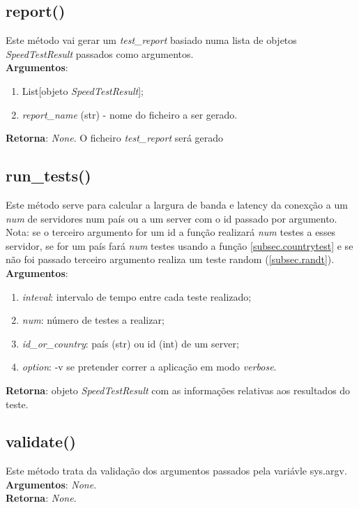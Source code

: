 \documentclass{report}
\begin{document}
\subsection{report()}
\label{subsec.report}
Este método vai gerar um \textit{test\_report} basiado numa lista de objetos \textit{SpeedTestResult} passados como argumentos.\\ 
\textbf{Argumentos}:
\begin{enumerate}
\item List[objeto \textit{SpeedTestResult}];
\item \textit{report\_name} (str) - nome do ficheiro a ser gerado.
\end{enumerate}
\textbf{Retorna}: \textit{None}. O ficheiro \textit{test\_report} será gerado

\subsection{run\_tests()}
\label{subsec.runt}
Este método serve para calcular a largura de banda e latency da conexção a um \textit{num} de servidores num país ou a um server com o id passado por argumento.\\
Nota: se o terceiro argumento for um id a função realizará \textit{num} testes a esses servidor, se for um país fará \textit{num} testes usando a função \autoref{subsec.countrytest} e se não foi passado terceiro argumento realiza um teste random (\autoref{subsec.randt}).\\
\textbf{Argumentos}: 
\begin{enumerate}
\item \textit{inteval}: intervalo de tempo entre cada teste realizado;
\item \textit{num}: número de testes a realizar;
\item \textit{id\_or\_country}: país (str) ou id (int) de um server;
\item \textit{option}: -v se pretender correr a aplicação em modo \textit{verbose}.
\end{enumerate}
\textbf{Retorna}: objeto \textit{SpeedTestResult} com as informações relativas aos resultados do teste.

\subsection{validate()}
\label{subsec.validate}
Este método trata da validação dos argumentos passados pela variávle sys.argv.\\ 
\textbf{Argumentos}: \textit{None}.\\
\textbf{Retorna}: \textit{None}.
\end{document}
